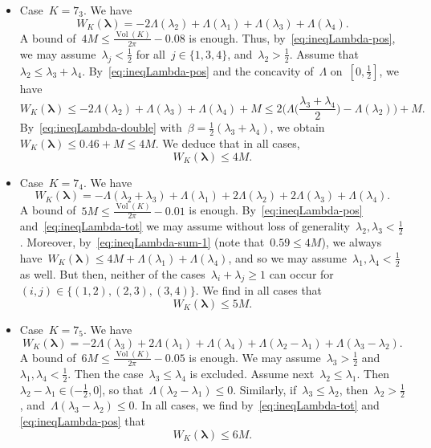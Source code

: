 \documentclass[11pt]{amsart}
\newcommand{\lambdab}{{\boldsymbol \lambda}}
\theoremstyle{definition}
\DeclareMathOperator{\Vol}{Vol}
\newcommand{\1}{{\mathbf 1}}
\numberwithin{equation}{section}
\begin{document}
\begin{itemize}
\item Case~$K = 7_3$. We have
  $$ W_K(\lambdab) = -2\Lambda(\lambda_2) + \Lambda(\lambda_1) + \Lambda(\lambda_3) + \Lambda(\lambda_4). $$
  A bound of~$4M \leq \frac{\Vol(K)}{2\pi} - 0.08$ is enough. Thus, by~\eqref{eq:ineqLambda-pos}, we may assume~$\lambda_j < \frac12$ for all~$j\in\{1, 3, 4\}$, and~$\lambda_2 > \frac12$. Assume that~$\lambda_2 \leq \lambda_3 + \lambda_4$. By~\eqref{eq:ineqLambda-pos} and the concavity of~$\Lambda$ on~$[0, \frac12]$, we have
  $$ W_K(\lambdab) \leq -2\Lambda(\lambda_2) + \Lambda(\lambda_3) + \Lambda(\lambda_4) + M \leq 2\Big(\Lambda\Big(\frac{\lambda_3 + \lambda_4}2\Big) - \Lambda(\lambda_2)\Big) + M. $$
  By~\eqref{eq:ineqLambda-double} with~$\beta = \frac12(\lambda_3 + \lambda_4)$, we obtain~$W_K(\lambdab) \leq 0.46 +M\leq 4M$. We deduce that in all cases,
  $$ W_K(\lambdab) \leq 4M. $$

\item Case~$K = 7_4$. We have
  $$ W_K(\lambdab) = -\Lambda(\lambda_2 + \lambda_3) + \Lambda(\lambda_1) + 2\Lambda(\lambda_2) + 2\Lambda(\lambda_3) + \Lambda(\lambda_4). $$
  A bound of~$5M \leq \frac{\Vol(K)}{2\pi} - 0.01$ is enough. By~\eqref{eq:ineqLambda-pos} and~\eqref{eq:ineqLambda-tot} we may assume without loss of generality~$\lambda_2, \lambda_3 < \frac12$. Moreover, by~\eqref{eq:ineqLambda-sum-1} (note that~$0.59 \leq 4M$), we always have~$W_K(\lambdab) \leq 4M + \Lambda(\lambda_1) + \Lambda(\lambda_4)$, and so we may assume~$\lambda_1, \lambda_4 < \frac12$ as well. But then, neither of the cases~$\lambda_i + \lambda_j \geq 1$ can occur for~$(i, j) \in \{(1, 2), (2, 3), (3, 4)\}$. We find in all cases that
  $$ W_K(\lambdab) \leq 5M. $$

\item Case~$K = 7_5$. We have
  $$ W_K(\lambdab) = -2\Lambda(\lambda_3) + 2\Lambda(\lambda_1) + \Lambda(\lambda_4) + \Lambda(\lambda_2 - \lambda_1) + \Lambda(\lambda_3 - \lambda_2). $$
  A bound of~$6M \leq \frac{\Vol(K)}{2\pi} - 0.05$ is enough. We may assume~$\lambda_3 > \frac12$ and~$\lambda_1, \lambda_4 < \frac12$. Then the case~$\lambda_3 \leq \lambda_4$ is excluded. Assume next~$\lambda_2 \leq \lambda_1$. Then~$\lambda_2 - \lambda_1 \in (-\frac12, 0]$, so that~$\Lambda(\lambda_2-\lambda_1) \leq 0$. Similarly, if~$\lambda_3 \leq \lambda_2$, then~$\lambda_2 > \frac12$, and~$\Lambda(\lambda_3 - \lambda_2) \leq 0$. In all cases, we find by~\eqref{eq:ineqLambda-tot} and \eqref{eq:ineqLambda-pos} that
  $$ W_K(\lambdab) \leq 6M. $$


\end{itemize}
\end{document}
